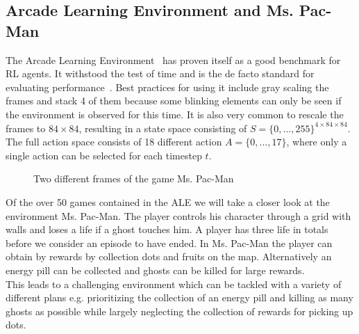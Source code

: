 \documentclass{article}
\begin{document}
\subsection{Arcade Learning Environment and Ms. Pac-Man}

The Arcade Learning Environment~\cite{DBLP:journals/corr/abs-1207-4708} has proven itself
as a good benchmark for RL agents. It withstood the test of time and is the de facto standard
for evaluating performance~\cite{DBLP:journals/corr/abs-1709-06009}. Best practices 
for using it include gray scaling the frames and stack 4 of them because some blinking
elements can only be seen if the environment is observed for this time. It is also
very common to rescale the frames to $84\times 84$, resulting in a state space consisting of $S = \{0,...,255\}^{4\times 84\times 84}$.
The full action space consists of 18 different action $A =\{0,...,17\}$, where only a single action
can be selected for each timestep $t$.\\
\begin{figure}[h]
    \centering
    \qquad
    \caption{Two different frames of the game Ms. Pac-Man}
\end{figure}

\noindent Of the over 50 games contained in the ALE we will take a closer look at the environment Ms. Pac-Man.
The player controls his character through a grid with walls and loses a life if a ghost
touches him. A player has three life in totals before we consider an episode to have ended.
In Ms. Pac-Man the player can obtain by rewards by collection dots and fruits on the map. Alternatively
an energy pill can be collected and ghosts can be killed for large rewards.\\
This leads to a challenging environment which can be tackled with a variety of different
plans e.g. prioritizing the collection of an energy pill and killing as many ghosts as possible
while largely neglecting the collection of rewards for picking up dots.
\end{document}
